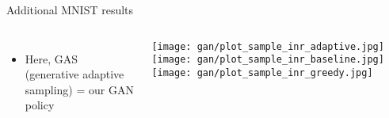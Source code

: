 \begin{frame}{Additional MNIST results}

\begin{columns}
    \begin{itemize}
        \item Here, GAS (generative adaptive sampling) = our GAN policy
    \end{itemize}
    \vfill
    \texttt{[image: gan/plot\_sample\_inr\_adaptive.jpg]}
    \texttt{[image: gan/plot\_sample\_inr\_baseline.jpg]}
    \texttt{[image: gan/plot\_sample\_inr\_greedy.jpg]}
    
\end{columns}
\end{frame}

